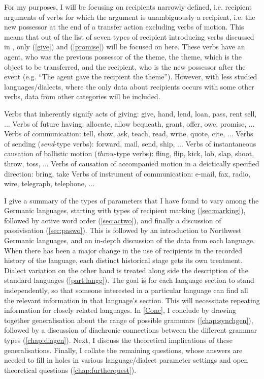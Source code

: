 For my purposes, I will be focusing on recipients narrowly defined, i.e. recipient arguments of verbs for which the argument is unambiguously a recipient, i.e. the new possessor at the end of a transfer action excluding verbs of motion. This means that out of the list of seven types of recipient introducing verbs discussed in \cite{Hovav.2008}, only (\ref{give}) and (\ref{promise}) will be focused on here. These verbs have an agent, who was the previous possessor of the theme, the theme, which is the object to be transferred, and the recipient, who is the new possessor after the event (e.g. ``The agent gave the recipient the theme''). However, with less studied languages/dialects, where the only data about recipients occurs with some other verbs, data from other categories will be included. 

\begin{exe}
\ex
\begin{xlist}
\ex\label{give} Verbs that inherently signify acts of giving: give, hand, lend, loan, pass, rent sell, ...
\ex \label{promise} Verbs of future having: allocate, allow bequeath, grant, offer, owe, promise, ...
\ex \label{tell} Verbs of communication: tell, show, ask, teach, read, write, quote, cite, ...
\ex \label{send} Verbs of sending (\emph{send}-type verbs): forward, mail, send, ship, ...
\ex \label{throw} Verbs of instantaneous causation of ballistic motion (\emph{throw}-type verbs): fling, flip, kick, lob, slap, shoot, throw, toss, ...
\ex \label{bring} Verbs of causation of accompanied motion in a deictically specified direction: bring, take
\ex \label{fax} Verbs of instrument of communication: e-mail, fax, radio, wire, telegraph, telephone, ...
\end{xlist}
\end{exe}

I give a summary of the types of parameters that I have found to vary among the Germanic languages, starting with types of recipient marking (\autoref{sec:marking}), followed by active word order (\autoref{sec:actwo}), and finally a discussion of passivisation (\autoref{sec:paswo}). This is followed by an introduction to Northwest Germanic languages,  and an in-depth discussion of the data from each language. When there has been a major change in the use of recipients in the recorded history of the language, each distinct historical stage gets its own treatment. Dialect variation on the other hand is treated along side the description of the standard languages (\autoref{part:langg}). The goal is for each language section to stand independently, so that someone interested in a particular language can find all the relevant information in that language's section. This will necessitate repeating information for closely related languages. In \autoref{Conc}, I conclude by drawing together generalisation about the range of possible grammars (\autoref{chap:synchgen}), followed by a discussion of diachronic connections between the different grammar types (\autoref{chap:diagen}). Next, I discuss the theoretical implications of these generalisations. Finally, I collate the remaining questions, whose answers are needed to fill in holes in various language/dialect parameter settings and open theoretical questions (\autoref{chap:furtherquest}). 

